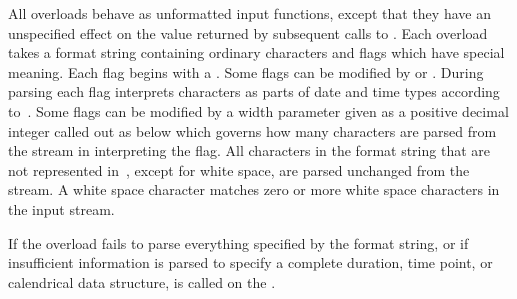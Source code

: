 \pnum
All  overloads behave as unformatted input functions,
except that they have an unspecified effect
on the value returned by subsequent calls to .
Each overload takes a format string containing ordinary characters
and flags which have special meaning.
Each flag begins with a \tcode{\%}.
Some flags can be modified by  or .
During parsing each flag interprets characters as parts of date and time types
according to~.
Some flags can be modified by a width parameter
given as a positive decimal integer called out as  below
which governs how many characters are parsed from the stream in interpreting the flag.
All characters in the format string that are not represented in~,
except for white space, are parsed unchanged from the stream.
A white space character matches zero or more white space characters in the input stream.

\pnum
If the  overload fails to parse
everything specified by the format string,
or if insufficient information is parsed to specify a complete
duration, time point, or calendrical data structure,
is called on the .

